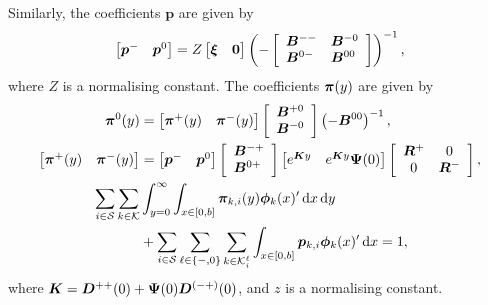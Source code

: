 Similarly, the coefficients \( {\boldsymbol{p}}\) are given by 
	\begin{equation}\begin{bmatrix} \boldsymbol{p}^{-}  & \boldsymbol{p}^{0} \end{bmatrix} = Z \begin{bmatrix} {\boldsymbol\xi} & \boldsymbol{0} \end{bmatrix} 
	\left(-\left[\begin{array}{ll} 
		{\boldsymbol B}^{--} & {\boldsymbol B}^{-0} \\
		{\boldsymbol B}^{0-} & {\boldsymbol B}^{00} 
		\end{array} \right] \right)^{-1},\label{eqn:pisystem1}\end{equation}
		where \(Z\) is a normalising constant. The coefficients \(\boldsymbol \pi(y)\) are given by 
\begin{align} 
	\;  {\boldsymbol{\pi}}^{0}(y) &= \begin{bmatrix}  {\boldsymbol{\pi}}^{+}(y) &  {\boldsymbol{\pi}}^{-}(y) \end{bmatrix}\left[\begin{array}{l} { {\boldsymbol B}}^{+0} \\ { {\boldsymbol B}}^{-0} \end{array} \right]\left(-{ {\boldsymbol B}}^{00}\right)^{-1}, \\ 
	 \begin{bmatrix}  {\boldsymbol{\pi}}^{+}(y) &  {\boldsymbol{\pi}}^{-}(y) \end{bmatrix}& = \begin{bmatrix}  {\boldsymbol{p}}^{-} &  {\boldsymbol{p}}^{0} \end{bmatrix}\left[\begin{array}{l} { {\boldsymbol B}}^{-+} \\ { {\boldsymbol B}}^{0+} \end{array} \right]\begin{bmatrix} e^{ {\boldsymbol K}y} & e^{ {\boldsymbol K}y}\boldsymbol \Psi(0) \end{bmatrix}\left[\begin{array}{cc}  {\boldsymbol R}^{+} & 0 \\ 0 &  {\boldsymbol R}^{-}\end{array}\right], \\
	 \sum_{i \in \mathcal{S}}\sum_{k \in \mathcal K} & \int_{y = 0}^{\infty} \int_{x \in [0,b]}  \boldsymbol \pi_{k,i}(y)\boldsymbol\phi_k(x)'{}\, \mathrm{d} x\, \mathrm{d} y 
	 \\&{}+  \sum_{i \in \mathcal{S}}\sum_{\ell \in \{-,0\}}\sum_{k\in \mathcal K_i^\ell}  \int_{x \in [0,b]}  \boldsymbol p_{k,i}\boldsymbol\phi_k(x)'{}\, \mathrm{d} x = 1,\label{eqn:pisystem2}
	\end{align}
	where $ {\boldsymbol K} =  {\boldsymbol D}^{++}(0) + \boldsymbol \Psi(0) {\boldsymbol D}^{(-+)}(0)$, and $z$ is a normalising constant.

